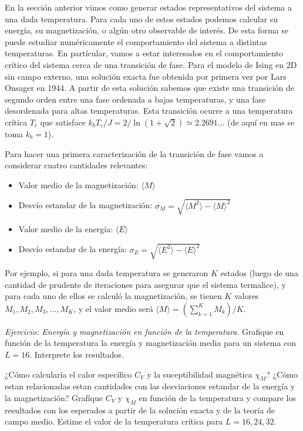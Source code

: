\documentclass[a4paper,11pt,oneside]{article}
\newcommand{\mean}[1]{\langle #1 \rangle}
\begin{document}
En la sección anterior vimos como generar estados representativos del sistema a
una dada temperatura. Para cada uno de estos
estados podemos calcular su energía, su magnetización, o algún otro observable
de interés. De esta forma se puede estudiar numéricamente el comportamiento del
sistema a distintas temperaturas. En partícular, vamos a estar interesados en
el comportamiento crítico del sistema cerca de una transición de fase. Para el
modelo de Ising en 2D sin campo externo, 
una solución exacta fue obtenida por primera vez por
Lars Onsager en 1944. A partir de esta solución sabemos que existe una
transición de segundo orden entre una fase ordenada a bajas temperaturas,
y una fase desordenada para altas temperaturas. Esta transición ocurre a una
temperatura crítica $T_c$ que satisface $k_b T_c /J = 2/\ln(1+\sqrt{2}) \simeq
2.2691\dots$ (de aquí en mas se toma $k_b=1$).

Para hacer una primera caracterización de la transición de fase vamos a
considerar cuatro cantidades relevantes:
\begin{itemize}
    \item Valor medio de la magnetización: $\langle M \rangle$
    \item Desvío estandar de la magnetización: $\sigma_M = \sqrt{\langle
        M^2 \rangle - \langle M \rangle^2}$
    \item Valor medio de la energía: $\langle E \rangle$
    \item Desvío estandar de la energía: $\sigma_E = \sqrt{\langle
        E^2 \rangle - \langle E \rangle^2}$
\end{itemize}
Por ejemplo, si para una dada temperatura 
se generaron $K$ estados (luego de una cantidad de prudente de
iteraciones para asegurar que el sistema termalice), y para cada uno de ellos
se calculó la magnetización, se tienen $K$ valores $M_1, M_2,M_3,\dots,M_K$, y
el valor medio será $\mean{M} = (\sum_{k=1}^K M_k)/K$.

\begin{mdframed}
\emph{Ejercicio: Energía y magnetización en función de la temperatura}.
Grafique en función de la temperatura la energía y magnetización media para un
sistema con $L=16$. Interprete los resultados. 

¿Cómo calcularía el calor específico $C_V$ y la suceptibilidad magnética
$\chi_M$? ¿Cómo estan
relacionadas estan cantidades con las desviaciones estandar de la energía y la
magnetización? Grafíque $C_V$ y $\chi_M$ en función de la temperatura y compare los
resultados con los esperados a partir de la solución exacta y de la teoría de
campo medio. Estime el valor de la temperatura crítica para $L=16,24,32$.
\end{mdframed}
\end{document}
